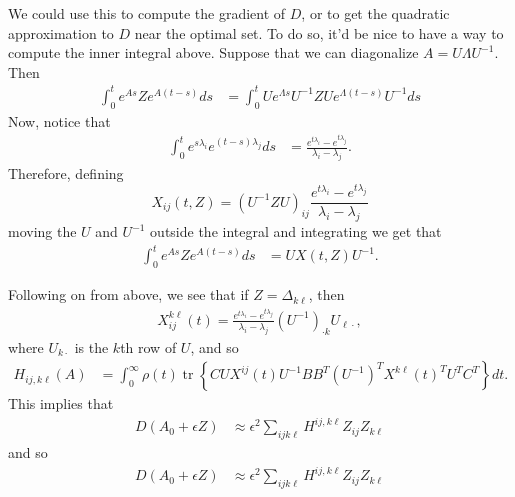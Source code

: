 \documentclass{article}
\newcommand{\tr}{\mathop{\mbox{tr}}} %
\newcommand{\1}{\mathbbm{1}}
\begin{document}
We could use this to compute the gradient of $D$,
or to get the quadratic approximation to $D$ near the optimal set.
To do so, it'd be nice to have a way to compute the inner integral above.
Suppose that we can diagonalize $A = U \Lambda U^{-1}$.
Then
\begin{equation} \label{eqn:exp_deriv}
  \begin{aligned}
      \int_0^t e^{As} Z e^{A(t-s)} ds 
      &=
      \int_0^t U e^{\Lambda s} U^{-1} Z U e^{\Lambda (t-s)} U^{-1} ds 
  \end{aligned}
\end{equation}
Now, notice that
\begin{equation}
  \begin{aligned}
      \int_0^t e^{s \lambda_i} e^{(t-s) \lambda_j} ds
      &=
      \frac{ e^{t \lambda_i} - e^{t \lambda_j} }{ \lambda_i - \lambda_j } .
  \end{aligned}
\end{equation}
Therefore, 
defining
\begin{equation}
    X_{ij}(t,Z) = \left( U^{-1} Z U \right)_{ij}
      \frac{ e^{t \lambda_i} - e^{t \lambda_j} }{ \lambda_i - \lambda_j } 
\end{equation}
moving the $U$ and $U^{-1}$ outside the integral and integrating we get that
\begin{equation}
  \begin{aligned}
      \int_0^t e^{As} Z e^{A(t-s)} ds 
      &=
      U X(t,Z) U^{-1} .
  \end{aligned}
\end{equation}

Following on from above, we see that if $Z=\Delta_{k \ell}$, then
\begin{equation}
  \begin{aligned}
      X_{ij}^{k\ell}(t) = 
      \frac{ e^{t \lambda_i} - e^{t \lambda_j} }{ \lambda_i - \lambda_j } 
      (U^{-1})_{\cdot k} U_{\ell \cdot},
  \end{aligned}
\end{equation}
where $U_{k \cdot}$ is the $k$th row of $U$,
and so
\begin{equation}
    \begin{aligned}
        H_{ij, k\ell}(A)
        &=
        \int_0^\infty
            \rho(t) \tr\left\{ C U X^{ij}(t) U^{-1} B B^T (U^{-1})^T X^{k\ell}(t)^T U^T C^T \right\}
        dt .
    \end{aligned}
\end{equation}
This implies that
\begin{equation}
    \begin{aligned}
        D(A_0+\epsilon Z)
        &\approx \epsilon^2\sum_{ijk\ell} H^{ij,k\ell} Z_{ij} Z_{k\ell} 
    \end{aligned}
\end{equation}
and so
\begin{equation}
    \begin{aligned}
        D(A_0+\epsilon Z)
        &\approx \epsilon^2\sum_{ijk\ell} H^{ij,k\ell} Z_{ij} Z_{k\ell} 
    \end{aligned}
\end{equation}
\end{document}

